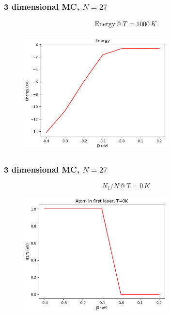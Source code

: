 \documentclass{beamer}
\begin{document}
\begin{frame}
    \frametitle{3 dimensional MC, $N=27$}

    $$\textup{Energy}\,@\, T=1000\,K$$

    \begin{figure}
        \includegraphics[width=0.7\textwidth]{images/denergy1000K.png}
    \end{figure}

\end{frame}

\begin{frame}
    \frametitle{3 dimensional MC, $N=27$}

    $$N_1/N\,@\,T=0\,K$$

    \begin{figure}
        \includegraphics[width=0.7\textwidth]{images/dratio0K.png}
    \end{figure}

\end{frame}
\end{document}
